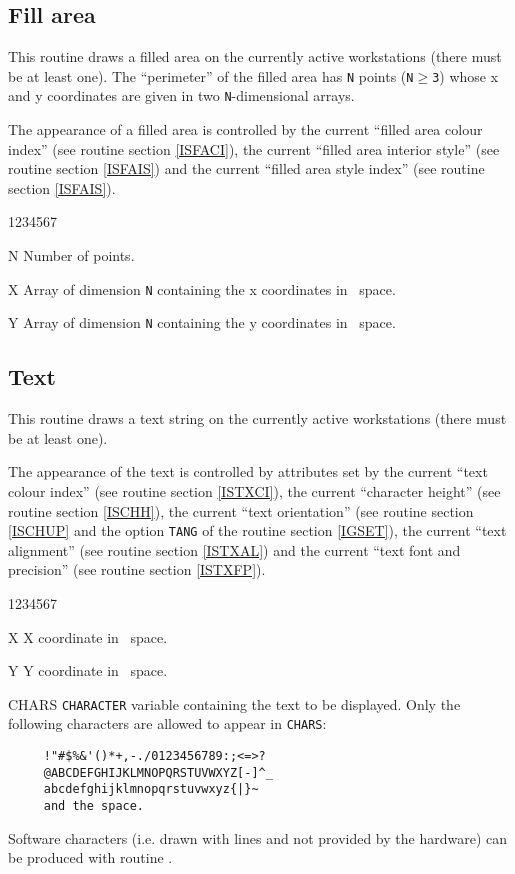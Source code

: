 \subsection{Fill area}
\Action
This routine draws a filled area on the currently active workstations (there
must be at least one). The ``perimeter'' of the filled area has {\tt N} points
({\tt N$\geq$3}) whose x and y coordinates are given in two {\tt N}-dimensional
arrays.

The appearance of a filled area is controlled by the current ``filled area
colour index'' (see routine  section \ref{ISFACI}), the current
``filled area interior style'' (see routine  section \ref{ISFAIS})
and the current ``filled area style index'' (see routine  section
\ref{ISFAIS}).
\Pdesc
\begin{DLtt}{1234567}
\item[N] Number of points.
\item[X] Array of dimension {\tt N} containing the x coordinates in \wc~space.
\item[Y] Array of dimension {\tt N} containing the y coordinates in \wc~space.
\end{DLtt}
%
\subsection{Text}
\Action
This routine draws a text string on the currently active workstations
(there must be at least one).

The appearance of the text is controlled by attributes set by the current ``text
colour index'' (see routine  section \ref{ISTXCI}), the current
``character height'' (see routine  section \ref{ISCHH}), the current
``text orientation'' (see routine  section \ref{ISCHUP} and the
option {\tt TANG} of the routine  section \ref{IGSET}), the current
``text alignment'' (see routine  section \ref{ISTXAL}) and the
current ``text font and precision'' (see routine  section
\ref{ISTXFP}).
\Pdesc
\begin{DLtt}{1234567}
\item[X] X coordinate in \wc~space.
\item[Y] Y coordinate in \wc~space.
\item[CHARS] {\tt CHARACTER} variable containing the text to be displayed.
             Only the following characters are allowed to appear in {\tt CHARS}:
\begin{verbatim}
     !"#$%&'()*+,-./0123456789:;<=>?
     @ABCDEFGHIJKLMNOPQRSTUVWXYZ[-]^_
     abcdefghijklmnopqrstuvwxyz{|}~
     and the space.
\end{verbatim}
\end{DLtt}
Software characters (i.e. drawn with lines and not provided by the hardware) can
be produced with routine .
%
%
